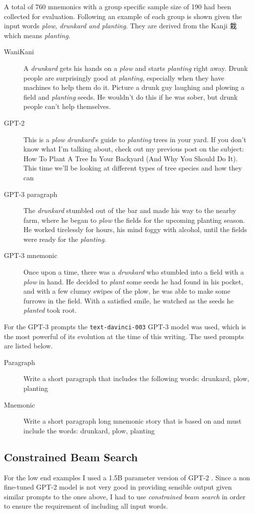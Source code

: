 A total of 760 mnemonics with a group specific sample size of 190 had been collected for evaluation. Following an example of each group is shown given the input words \emph{plow, drunkard and planting}. They are derived from the Kanji 栽 which means \emph{planting}.
\begin{description}
    \item[WaniKani] A \emph{drunkard} gets his hands on a \emph{plow} and starts \emph{planting} right away. Drunk people are surprisingly good at \emph{planting}, especially when they have machines to help them do it. Picture a drunk guy laughing and plowing a field and \emph{planting} seeds. He wouldn't do this if he was sober, but drunk people can't help themselves.
    \item[GPT-2]  This is a \emph{plow} \emph{drunkard}'s guide to \emph{planting} trees in your yard. If you don't know what I'm talking about, check out my previous post on the subject: How To Plant A Tree In Your Backyard (And Why You Should Do It). This time we'll be looking at different types of tree species and how they can
    \item[GPT-3 paragraph] The \emph{drunkard} stumbled out of the bar and made his way to the nearby farm, where he began to \emph{plow} the fields for the upcoming planting season. He worked tirelessly for hours, his mind foggy with alcohol, until the fields were ready for the \emph{planting}.
    \item[GPT-3 mnemonic] Once upon a time, there was a \emph{drunkard} who stumbled into a field with a \emph{plow} in hand. He decided to \emph{plant} some seeds he had found in his pocket, and with a few clumsy swipes of the plow, he was able to make some furrows in the field. With a satisfied smile, he watched as the seeds he \emph{planted} took root. 
\end{description}
For the GPT-3 prompts the \texttt{text-davinci-003} GPT-3 model was used, which is the most powerful of its evolution at the time of this writing. The used prompts are listed below.
\begin{description}
    \item[Paragraph] Write a short paragraph that includes the following words: drunkard, plow, planting
    \item[Mnemonic] Write a short paragraph long mnemonic story that is based on and must include the words: drunkard, plow, planting
\end{description}
\subsection{Constrained Beam Search}
For the low end examples I used a 1.5B parameter version of GPT-2 \cite{radford2019language}. Since a non fine-tuned GPT-2 model is not very good in providing sensible output given similar prompts to the ones above, I had to use \emph{constrained beam search} in order to ensure the requirement of including all input words.


